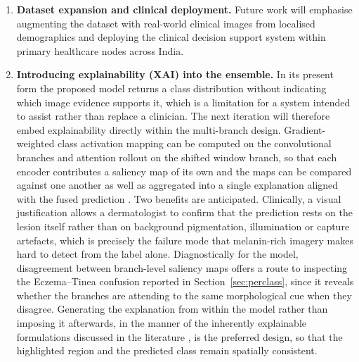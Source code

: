 \documentclass[pdflatex,sn-mathphys-num]{sn-jnl}%
\begin{document}
\begin{enumerate}
\item \textbf{Dataset expansion and clinical deployment.} Future work will emphasise
augmenting the dataset with real-world clinical images from localised demographics and
deploying the clinical decision support system within primary healthcare nodes across India.
\item \textbf{Introducing explainability (XAI) into the ensemble.} In its present form the
proposed model returns a class distribution without indicating which image evidence supports
it, which is a limitation for a system intended to assist rather than replace a clinician. The
next iteration will therefore embed explainability directly within the multi-branch design.
Gradient-weighted class activation mapping can be computed on the convolutional branches and
attention rollout on the shifted window branch, so that each encoder contributes a saliency map
of its own and the maps can be compared against one another as well as aggregated into a single
explanation aligned with the fused prediction \cite{ref21,ref22}. Two benefits are anticipated.
Clinically, a visual justification allows a dermatologist to confirm that the prediction rests
on the lesion itself rather than on background pigmentation, illumination or capture artefacts,
which is precisely the failure mode that melanin-rich imagery makes hard to detect from the
label alone. Diagnostically for the model, disagreement between branch-level saliency maps
offers a route to inspecting the Eczema--Tinea confusion reported in
Section~\ref{sec:perclass}, since it reveals whether the branches are attending to the same
morphological cue when they disagree. Generating the explanation from within the model rather
than imposing it afterwards, in the manner of the inherently explainable formulations
discussed in the literature \cite{ref19,ref20}, is the preferred design, so that the
highlighted region and the predicted class remain spatially consistent.
\end{enumerate}
\end{document}
